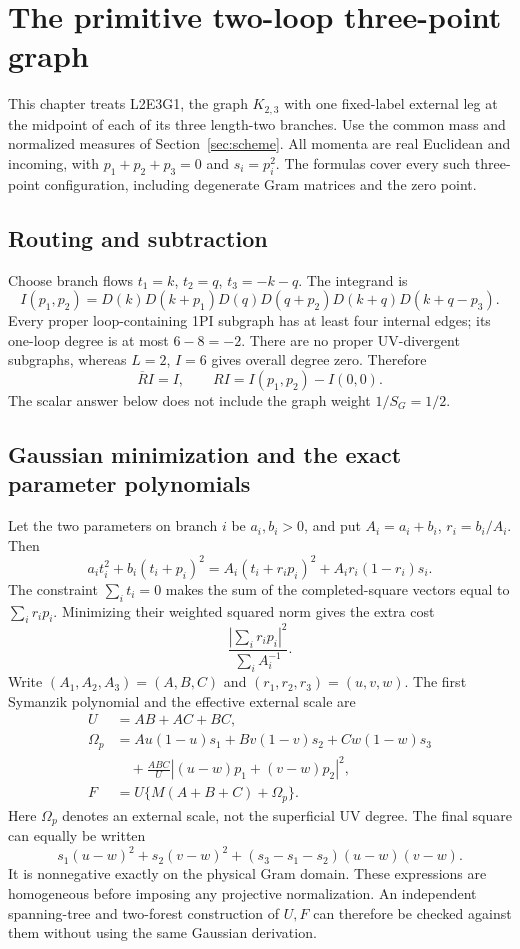 \section{The primitive two-loop three-point graph}
\label{sec:primitive}

This chapter treats L2E3G1, the graph $K_{2,3}$ with one fixed-label external
leg at the midpoint of each of its three length-two branches. Use the common
mass and normalized measures of Section~\ref{sec:scheme}. All momenta are
real Euclidean and incoming, with $p_1+p_2+p_3=0$ and $s_i=p_i^2$.
The formulas cover every such three-point configuration, including
degenerate Gram matrices and the zero point.

\subsection{Routing and subtraction}

Choose branch flows $t_1=k$, $t_2=q$, $t_3=-k-q$. The integrand is
\[
 I(p_1,p_2)=D(k)D(k+p_1)D(q)D(q+p_2)
             D(k+q)D(k+q-p_3).
\]
Every proper loop-containing 1PI subgraph has at least four internal edges;
its one-loop degree is at most $6-8=-2$. There are no proper UV-divergent
subgraphs, whereas $L=2$, $I=6$ gives overall degree zero. Therefore
\[
 \overline R I=I,\qquad RI=I(p_1,p_2)-I(0,0).
\]
The scalar answer below does not include the graph weight $1/S_G=1/2$.

\subsection{Gaussian minimization and the exact parameter polynomials}

Let the two parameters on branch $i$ be $a_i,b_i>0$, and put
$A_i=a_i+b_i$, $r_i=b_i/A_i$. Then
\[
 a_it_i^2+b_i(t_i+p_i)^2
 =A_i(t_i+r_ip_i)^2+A_ir_i(1-r_i)s_i.
\]
The constraint $\sum_i t_i=0$ makes the sum of the completed-square
vectors equal to $\sum_i r_ip_i$. Minimizing their weighted squared norm
gives the extra cost
\[
 \frac{|\sum_i r_ip_i|^2}{\sum_i A_i^{-1}}.
\]
Write $(A_1,A_2,A_3)=(A,B,C)$ and $(r_1,r_2,r_3)=(u,v,w)$. The first
Symanzik polynomial and the effective external scale are
\begin{align*}
 U&=AB+AC+BC,\\
 \Omega_p&=Au(1-u)s_1+Bv(1-v)s_2+Cw(1-w)s_3\\
 &\quad+\frac{ABC}{U}|(u-w)p_1+(v-w)p_2|^2,\\
 F&=U\{M(A+B+C)+\Omega_p\}.
\end{align*}
Here $\Omega_p$ denotes an external scale, not the superficial UV degree.
The final square can equally be written
\[
 s_1(u-w)^2+s_2(v-w)^2
 +(s_3-s_1-s_2)(u-w)(v-w).
\]
It is nonnegative exactly on the physical Gram domain. These expressions
are homogeneous before imposing any projective normalization. An independent
spanning-tree and two-forest construction of $U,F$ can therefore be checked
against them without using the same Gaussian derivation.

